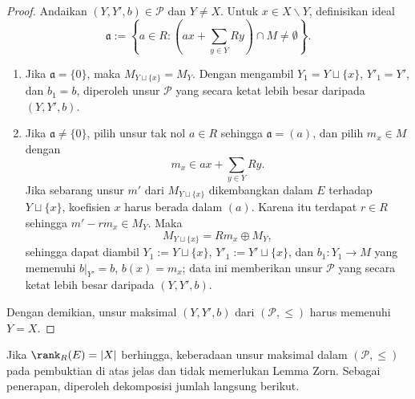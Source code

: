 \begin{proof}
	Andaikan $(Y,Y',b) \in \mathcal{P}$ dan $Y \neq X$. Untuk $x \in X \smallsetminus Y$, definisikan ideal
	\[ \mathfrak{a} := \left\{a \in R : \left( ax + \sum_{y \in Y} Ry \right) \cap M \neq \emptyset \right\}. \]
	\begin{enumerate}
		\item Jika $\mathfrak{a}=\{0\}$, maka $M_{Y \sqcup \{x\}} = M_Y$. Dengan mengambil $Y_1 = Y \sqcup \{x\}$, $Y'_1 = Y'$, dan $b_1 = b$, diperoleh unsur $\mathcal{P}$ yang secara ketat lebih besar daripada $(Y,Y',b)$.
		\item Jika $\mathfrak{a} \neq \{0\}$, pilih unsur tak nol $a \in R$ sehingga $\mathfrak{a} = (a)$, dan pilih $m_x \in M$ dengan
			\[ m_x \in ax + \sum_{y \in Y} Ry. \]
			Jika sebarang unsur $m'$ dari $M_{Y \sqcup \{x\}}$ dikembangkan dalam $E$ terhadap $Y \sqcup \{x\}$, koefisien $x$ harus berada dalam $(a)$. Karena itu terdapat $r \in R$ sehingga $m' - rm_x \in M_Y$. Maka
			\[ M_{Y \sqcup \{x\}} = Rm_x \oplus M_Y, \]
		sehingga dapat diambil $Y_1 := Y \sqcup \{x\}$, $Y'_1 := Y' \sqcup \{x\}$, dan $b_1: Y_1 \to M$ yang memenuhi $b|_{Y'}=b$, $b(x) = m_x$; data ini memberikan unsur $\mathcal{P}$ yang secara ketat lebih besar daripada $(Y,Y',b)$.
	\end{enumerate}
	Dengan demikian, unsur maksimal $(Y,Y',b)$ dari $(\mathcal{P}, \leq)$ harus memenuhi $Y=X$.
\end{proof}
Jika $\rank_R(E) = |X|$ berhingga, keberadaan unsur maksimal dalam $(\mathcal{P}, \leq)$ pada pembuktian di atas jelas dan tidak memerlukan Lemma Zorn. Sebagai penerapan, diperoleh dekomposisi jumlah langsung berikut.

